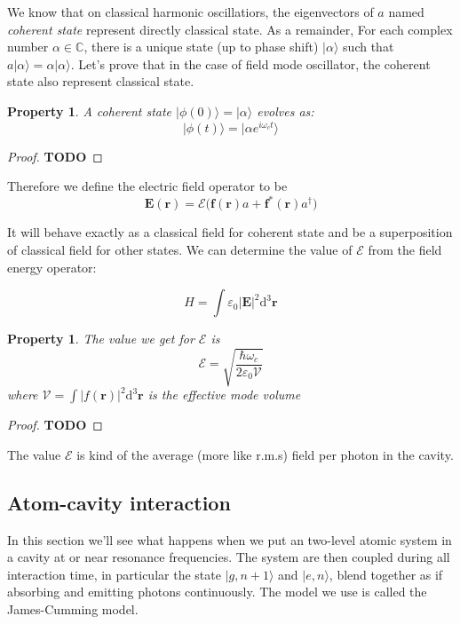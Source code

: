 \documentclass[10pt]{report}
\theoremstyle{plain}
\newtheorem{prop}[thm]{Property}
\theoremstyle{definition}
\theoremstyle{remark}
\newcommand{\C}{\ensuremath{\mathbb{C}}}
\newcommand{\TODO}{\textbf{TODO}}
\newcommand{\ket}[1]{|#1\rangle}
\newcommand{\dd}{\mathrm{d}}
\newcommand{\bs}{\boldsymbol}
\begin{document}
We know that on classical harmonic oscillatiors, the eigenvectors of $a$ named
\emph{coherent state} represent directly classical state. As a remainder, For
each complex number $\alpha \in \C$, there is a unique state (up to phase shift)
$\ket \alpha$ such that $a \ket \alpha = \alpha \ket \alpha$.
Let's prove that in the case of field mode oscillator, the coherent state also
represent classical state.

\begin{prop}
  A coherent state $\ket{\phi(0)} = \ket \alpha$ evolves as:
  \[ \ket {\phi(t)} = \ket {\alpha e^{i\omega_c t}} \]
\end{prop}

\begin{proof}\TODO{}
\end{proof}

Therefore we define the electric field operator to be
\begin{equation}\label{eqn:Eop}
\bs E(\bs r) = \mathcal{E}\big(\bs f(\bs r) a + \bs f^*(\bs r)
  a^\dagger \big)
\end{equation}

It will behave exactly as a classical field for coherent state and be a
superposition of classical field for other states. We can determine the value of
$\mathcal{E}$ from the field energy operator:

\[ H = \int \varepsilon_0 |{\bs E}|^2 \dd^3 \bs r \]

\begin{prop}
  The value we get for $\mathcal{E}$ is
\[ \mathcal{E} = \sqrt{\frac{\hbar \omega_c}{2 \varepsilon_0 \mathcal{V}}}\]
where $\mathcal{V} = \int \bs |f(\bs r)|^2\dd^3\bs r$ is the effective mode volume
\end{prop}

\begin{proof} \TODO{}
\end{proof}

The value $\mathcal{E}$ is kind of the average (more like r.m.s) field per
photon in the cavity.

\subsection{Atom-cavity interaction}


In this section we'll see what happens when we put an two-level atomic system in
a cavity at or near resonance frequencies. The system are then coupled during
all interaction time, in particular the state $\ket{g,n+1}$ and $\ket{e,n}$,
blend together as if absorbing and emitting photons continuously. The model we
use is called the James-Cumming model.
\end{document}
